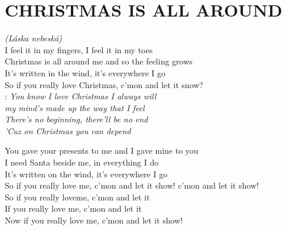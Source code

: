 \section*{\Huge CHRISTMAS IS ALL AROUND}
\emph{(Láska nebeská)}\\

I feel it in my fingers, I feel it in my toes\\
Christmas is all around me and so the feeling grows\\

It's written in the wind, it's everywhere I go\\
So if you really love Christmas, c'mon and let it snow?\\

\textregistered:
\emph{
You know I love Christmas I always will\\
my mind's made up the way that I feel\\
There's no beginning, there'll be no end\\
'Cuz on Christmas you can depend\\
}

You gave your presents to me and I gave mine to you\\
I need Santa beside me, in everything I do \hspace{1cm} \textregistered\\

It's written on the wind, it's everywhere I go\\
So if you really love me, c'mon and let it show! c'mon and let it show!\\

So if you really loveme, c'mon and let it\\
If you really love me,\hspace{0,5cm} c'mon and let it\\
Now if you really love me,\hspace{0,5cm} c'mon and let it show!\\

\newpage
